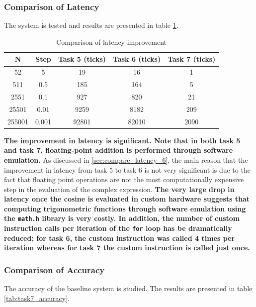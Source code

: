 \documentclass{article}
\begin{document}
\subsubsection{Comparison of Latency}
The system is tested and results are presented in table \ref{tab:task7_latency_1}.

\begin{table}[H]
  \centering
    \begin{tabular}{|c|c|c|c|c|}
    \hline
    \textbf{N} & \textbf{Step} & \textbf{Task 5 (ticks)} & \textbf{Task 6 (ticks)} & \textbf{Task 7 (ticks)} \\
    \hline
    52    & 5     & 19    & 16    & 1 \\
    \hline
    511   & 0.5   & 185   & 164   & 5 \\
    \hline
    2551  & 0.1   & 927   & 820   & 21 \\
    \hline
    25501 & 0.01  & 9259  & 8182  & 209 \\
    \hline
    255001 & 0.001 & 92801 & 82010 & 2090 \\
    \hline
    \end{tabular}%
  \caption{Comparison of latency improvement }
  \label{tab:task7_latency_1}%
\end{table}%

\textbf{The improvement in latency is significant. Note that in both task 5 and task 7, floating-point addition is performed through software emulation.} As discussed in \ref{sec:compare_latency_6}, the main reason that the improvement in latency from task 5 to task 6 is not very significant is due to the fact that floating point operations are not the most computationally expensive step in the evaluation of the complex expression. \textbf{The very large drop in latency once the cosine is evaluated in custom hardware suggests that computing trigonometric functions through software emulation using the {\tt math.h} library is very costly. In addition, the number of custom instruction calls per iteration of the {\tt for} loop has be dramatically reduced; for task 6, the custom instruction was called 4 times per iteration whereas for task 7 the custom instruction is called just once.}\\ 

\subsubsection{Comparison of Accuracy}

The accuracy of the baseline system is studied. The results are presented in table \ref{tab:task7_accuracy}.
\end{document}
